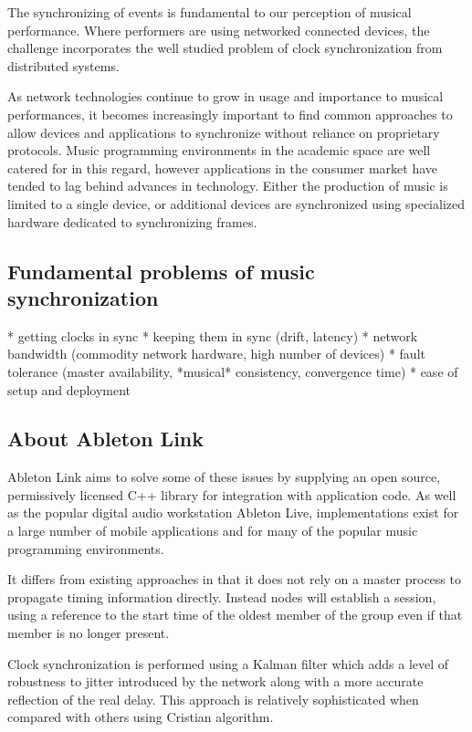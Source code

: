 \documentclass[11pt]{article} %
\theoremstyle{plain}
\theoremstyle{definition}
\begin{document}
The synchronizing of events is fundamental to our perception of musical
performance. Where performers are using networked connected devices, the
challenge incorporates the well studied problem of clock synchronization from
distributed systems.

As network technologies continue to grow in usage and importance to musical
performances\cite{madgwick2015simple}, it becomes increasingly important to
find common approaches to allow devices and applications to synchronize without
reliance on proprietary protocols. Music programming environments in the
academic space are well catered for in this regard, however applications in the
consumer market have tended to lag behind advances in technology. Either the
production of music is limited to a single device, or additional devices are
synchronized using specialized hardware dedicated to synchronizing frames.

\subsection{Fundamental problems of music synchronization}

* getting clocks in sync
* keeping them in sync (drift, latency)
* network bandwidth (commodity network hardware, high number of devices)
* fault tolerance (master availability, *musical* consistency, convergence time)
* ease of setup and deployment

\subsection{About Ableton Link}

Ableton Link aims to solve some of these issues by supplying an open source,
permissively licensed C++ library for integration with application code. As
well as the popular digital audio workstation Ableton Live, implementations
exist for a large number of mobile applications and for many of the popular
music programming environments.

It differs from existing approaches in that it does not rely on a master
process to propagate timing information directly. Instead nodes will establish
a session, using a reference to the start time of the oldest member of the
group even if that member is no longer present.

Clock synchronization is performed using a Kalman filter\cite{} which adds a
level of robustness to jitter introduced by the network along with a more
accurate reflection of the real delay. This approach is relatively
sophisticated when compared with others using Cristian algorithm.
\end{document}
